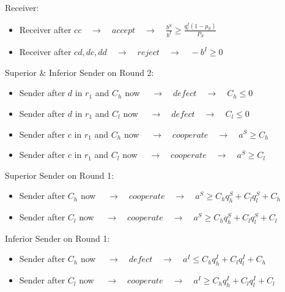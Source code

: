 \documentclass[11pt]{article}
\theoremstyle{plainCl1}
\begin{document}
Receiver:
\begin{itemize} [noitemsep]
	\item Receiver after $cc \quad \rightarrow \quad accept \quad \rightarrow \quad \frac{b^S}{b^I}\geq \frac{q^I_l (1-p_S)}{P_S}$\\
	\item Receiver after $cd, dc, dd \quad \rightarrow \quad reject \quad \rightarrow \quad -b^I \geq 0$\\
\end{itemize}
Superior \& Inferior Sender on Round 2:
\begin{itemize} [noitemsep]
	\item Sender after $d$ in $r_1$ and $C_h$ now $\quad \rightarrow \quad defect \quad \rightarrow \quad C_h \leq 0$\\
	\item Sender after $d$ in $r_1$ and $C_l$ now $\quad \rightarrow \quad defect \quad \rightarrow \quad C_l \leq 0$\\
	\item Sender  after $c$ in $r_1$ and $C_h$ now $\quad \rightarrow \quad cooperate \quad \rightarrow \quad a^S \geq C_h$\\
	\item Sender  after $c$ in $r_1$ and $C_l$ now $\quad \rightarrow \quad cooperate \quad \rightarrow \quad a^S \geq C_l$\\
\end{itemize}
Superior Sender on Round 1:
\begin{itemize} [noitemsep]
	\item Sender after $C_h$ now $\quad \rightarrow \quad cooperate \quad \rightarrow \quad a^S \geq C_h q^S_h + C_l q^S_l + C_h$\\
	\item Sender after $C_l$ now $\quad \rightarrow \quad cooperate \quad \rightarrow \quad a^S \geq C_h q^S_h + C_l q^S_l + C_l$\\
\end{itemize}
Inferior Sender on Round 1:
\begin{itemize} [noitemsep]
	\item Sender after $C_h$ now $\quad \rightarrow \quad defect \quad \rightarrow \quad a^I \leq C_h q^I_h + C_l q^I_l + C_h$\\
	\item Sender after $C_l$ now $\quad \rightarrow \quad cooperate \quad \rightarrow \quad a^I \geq C_h q^I_h + C_l q^I_l + C_l$\\
\end{itemize}
\end{document}
